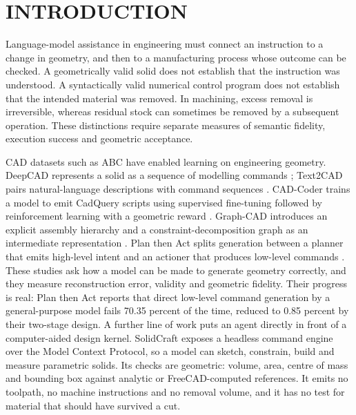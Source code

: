 \section{INTRODUCTION}

Language-model assistance in engineering must connect an instruction to a change in geometry, and then to a manufacturing process whose outcome can be checked. A geometrically valid solid does not establish that the instruction was understood. A syntactically valid numerical control program does not establish that the intended material was removed. In machining, excess removal is irreversible, whereas residual stock can sometimes be removed by a subsequent operation. These distinctions require separate measures of semantic fidelity, execution success and geometric acceptance.

CAD datasets such as ABC \cite{Koch2019ABC} have enabled learning on engineering geometry. DeepCAD represents a solid as a sequence of modelling commands \cite{Wu2021DeepCAD}; Text2CAD pairs natural-language descriptions with command sequences \cite{Khan2024Text2CAD}. CAD-Coder trains a model to emit CadQuery scripts using supervised fine-tuning followed by reinforcement learning with a geometric reward \cite{Guan2025CADCoder}. Graph-CAD introduces an explicit assembly hierarchy and a constraint-decomposition graph as an intermediate representation \cite{GraphCAD2026}. Plan then Act splits generation between a planner that emits high-level intent and an actioner that produces low-level commands \cite{Guo2026PTA}. These studies ask how a model can be made to generate geometry correctly, and they measure reconstruction error, validity and geometric fidelity. Their progress is real: Plan then Act reports that direct low-level command generation by a general-purpose model fails 70.35 percent of the time, reduced to 0.85 percent by their two-stage design. A further line of work puts an agent directly in front of a computer-aided design kernel. SolidCraft \cite{SolidCraft2026} exposes a headless command engine over the Model Context Protocol, so a model can sketch, constrain, build and measure parametric solids. Its checks are geometric: volume, area, centre of mass and bounding box against analytic or FreeCAD-computed references. It emits no toolpath, no machine instructions and no removal volume, and it has no test for material that should have survived a cut.

